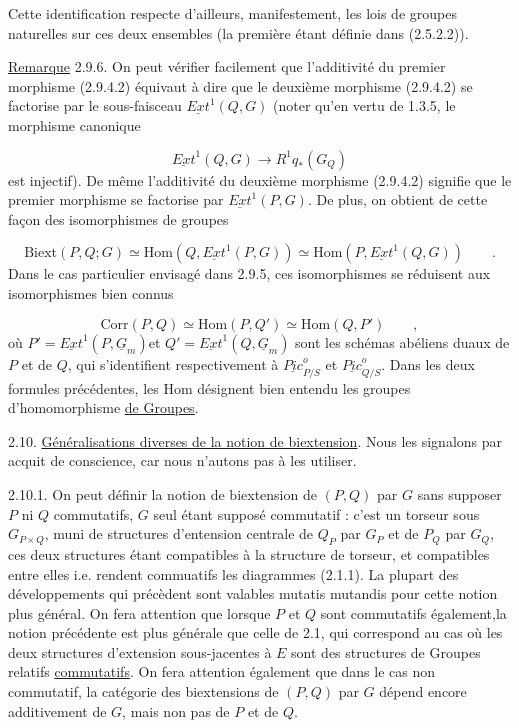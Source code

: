 
Cette identification respecte d'ailleurs, manifestement, les lois de groupes naturelles sur ces deux ensembles (la première étant définie dans (2.5.2.2)).

\underline{Remarque} 2.9.6. On peut vérifier facilement que l'additivité du premier morphisme (2.9.4.2) équivaut à dire que le deuxième morphisme (2.9.4.2) se factorise par le sous-faisceau $\underline{Ext}^1(Q,G)$ (noter qu'en vertu de 1.3.5, le morphisme canonique

\begin{equation*}
\underline{Ext}^1(Q,G) \longrightarrow R^1q_*(G_Q)
\end{equation*}
est injectif). De même l'additivité du deuxième morphisme (2.9.4.2) signifie que le premier morphisme se factorise par $\underline{Ext}^1(P,G)$. De plus, on obtient de cette façon des isomorphismes de groupes

\begin{equation}\tag{2.9.6.1}
\mathrm{Biext}(P,Q;G) \simeq \mathrm{Hom}(Q,\underline{Ext}^1(P,G)) \simeq \mathrm{Hom}(P,\underline{Ext}^1(Q,G)) \qquad .
\end{equation}
Dans le cas particulier envisagé dans 2.9.5, ces isomorphismes se réduisent aux isomorphismes bien connus

\begin{equation}\tag{2.9.6.2}
\mathrm{Corr}(P,Q) \simeq \mathrm{Hom}(P,Q') \simeq \mathrm{Hom}(Q,P') \qquad ,
\end{equation}
où $P' = \underline{Ext}^1(P,\underline{G}_m)$et $Q' = \underline{Ext}^1(Q,\underline{G}_m)$ sont les schémas abéliens duaux de $P$ et de $Q$, qui s'identifient respectivement à $\underline{Pic}^o_{P/S}$ et $\underline{Pic}^o_{Q/S}$. Dans les deux formules précédentes, les Hom désignent bien entendu les groupes d'homomorphisme \underline{de Groupes}.

2.10.  \underline{Généralisations diverses de la notion de biextension}. Nous les signalons par acquit de conscience, car nous n'autons pas à les utiliser.

2.10.1. On peut définir la notion de biextension  de $(P,Q)$ par $G$ sans supposer $P$ ni $Q$ commutatifs, $G$ seul étant supposé commutatif : c'est un
torseur sous $G_{P\times Q}$, muni de structures d'entension centrale de $Q_P$ par $G_P$ et de $P_Q$ par $G_Q$, ces deux structures étant compatibles à la structure de torseur, et compatibles entre elles i.e. rendent commuatifs les diagrammes (2.1.1). La plupart des développements qui précèdent sont valables mutatis mutandis pour cette notion plus général. On fera attention que lorsque $P$ et $Q$ sont commutatifs également,la notion précédente est    plus générale que celle de 2.1, qui correspond au cas où les deux structures d'extension sous-jacentes à $E$ sont des structures de Groupes relatifs \underline{commutatifs}. On fera attention également que dans le cas non commutatif, la catégorie des biextensions de $(P,Q)$ par $G$ dépend encore additivement de $G$, mais non pas de $P$ et de $Q$.

